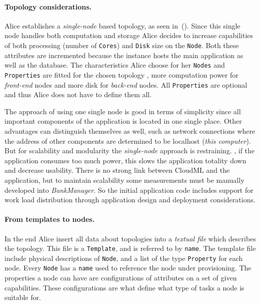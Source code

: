 \paragraph{Topology considerations.}

Alice establishes a \emph{single-node} based topology, as seen in~().
Since this single node handles both computation and storage Alice decides to 
increase capabilities of both processing (number of \texttt{Cores}) and 
\texttt{Disk} size on the \texttt{Node}.
Both these attributes are incremented because the instance hosts
the main application as well as the database.
The characteristics Alice choose for her \texttt{Nodes} and \texttt{Properties} are fitted
for the chosen topology \eg, more computation power for 
\emph{front-end} nodes and more disk for \emph{back-end} nodes.
All \texttt{Properties} are optional and thus Alice does not have to define them all.

The approach of using one single node is good in terms of simplicity since all important
components of the application is located in one single place.
Other advantages can distinguish themselves as well, such as network connections where
the address of other components are determined to be localhost (\emph{this computer}).
But for scalability and modularity the \emph{single-node} approach is restraining.
\eg, if the application consumes too much  power, 
this slows the application totality down and decrease usability.
There is no strong link between CloudML and the application, but to maintain
scalability some measurements must be manually developed into \emph{BankManager}.
So the initial application code includes support for work load distribution through 
application design and deployment considerations.

\paragraph{From templates to nodes.}

In the end Alice insert all data about topologies into a \emph{textual file} which describes the topology.
This file is a \texttt{Template}, and is referred to by \texttt{name}.
The template file include physical descriptions of \texttt{Node},
and a list of the type \texttt{Property} for each node.
Every \texttt{Node} has a \texttt{name} used to reference the node under provisioning.
The properties a node can have are configurations of attributes on a set of given capabilities.
These configurations are what define what type of tasks a node is suitable for.

